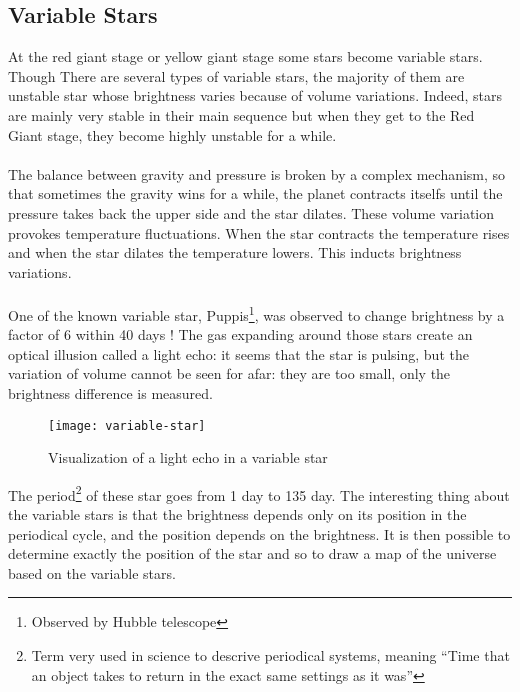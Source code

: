 \documentclass[a4paper, 11pt]{article} %
\begin{document}
\subsection{Variable Stars}

At the red giant stage or yellow giant stage some stars become variable stars. Though There are several types of variable stars, the majority of them are unstable star whose brightness varies because of volume variations. Indeed, stars are mainly very stable in their main sequence but when they get to the Red Giant stage, they become highly unstable for a while. 





\paragraph*{}
The balance between gravity and pressure is broken by a complex mechanism, so that sometimes the gravity wins for a while, the planet contracts itselfs until the pressure takes back the upper side and the star dilates. These volume variation provokes temperature fluctuations. When the star contracts the temperature rises and when the star dilates the temperature lowers. This inducts brightness variations. 
\paragraph*{}
One of the known variable star, Puppis\footnote{Observed by Hubble telescope}, was observed to change brightness by a factor of 6 within 40 days ! The gas expanding around those stars create an optical illusion called a light echo: it seems that the star is pulsing, but the variation of volume cannot be seen for afar: they are too small, only the brightness difference is measured.

\begin{figure}[h]
\centering
\texttt{[image: variable-star]}
\caption{Visualization of a light echo in a variable star}
\end{figure}

The period\footnote{Term very used in science to descrive periodical systems, meaning ``Time that an object takes to return in the exact same settings as it was''}  of these star goes from 1 day to 135 day. The interesting thing about the variable stars is that the brightness depends only on its position in the periodical cycle, and the position depends on the brightness. It is then possible to determine exactly the position of the star and so to draw a map of the universe based on the variable stars.
 
\end{document}
